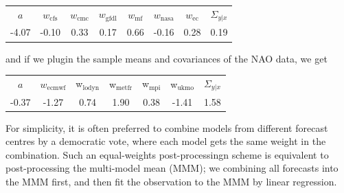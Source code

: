 \documentclass[12pt]{article}
\begin{document}
\begin{center}
\begin{tabular}{c|cccccc|c}
     $a$  &$w_{\mathrm{cfs}}$  &$w_{\mathrm{cmc}}$ &$w_{\mathrm{gfdl}}$   &$w_{\mathrm{mf}}$ &$w_{\mathrm{nasa}}$   &$w_{\mathrm{ec}}$      &$\Sigma_{y|x}$ \\
 -4.07  &-0.10   &0.33   &0.17   &0.66  &-0.16   &0.28   &0.19 
\end{tabular}
\end{center}

and if we plugin the sample means and covariances of the NAO data, we get

\begin{center}
\begin{tabular}{c|ccccc|c}
       $a$  &$w_{\mathrm{ecmwf}}$  &w$_{\mathrm{lodyn}}$  &w$_{\mathrm{metfr}}$    &w$_{\mathrm{mpi}}$   &w$_{\mathrm{ukmo}}$        &$\Sigma_{y|x}$ \\
-0.37 & -1.27  & 0.74  & 1.90  & 0.38 & -1.41  & 1.58
\end{tabular}
\end{center}


For simplicity, it is often preferred to combine models from different forecast centres by a democratic vote, where each model gets the same weight in the combination.
Such an equal-weights post-processingn scheme is equivalent to post-processing the multi-model mean (MMM); we combining all forecasts into the MMM first, and then fit the observation to the MMM by linear regression.
\end{document}
